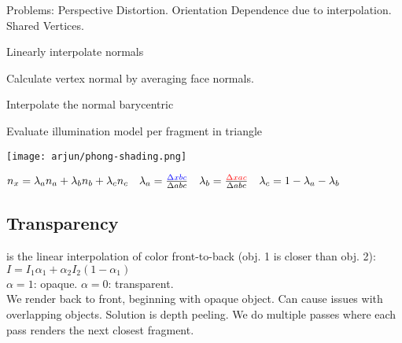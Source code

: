 Problems: Perspective Distortion. Orientation Dependence due to interpolation. Shared Vertices.

 Linearly interpolate normals
\begin{compactenum}
    \item Calculate vertex normal by averaging face normals.
    \item Interpolate the normal barycentric
    \item Evaluate illumination model per fragment in triangle
\end{compactenum}
\begin{center}
    \texttt{[image: arjun/phong-shading.png]}
\end{center}

$ n_x = \lambda_an_a + \lambda_bn_b + \lambda_cn_c  \quad \lambda_a = \frac{\color{blue} \Delta xbc}{\Delta abc} \quad \lambda_b = \frac{\color{red} \Delta xac}{\Delta abc} \quad \lambda_c = 1 - \lambda_a - \lambda_b$ 

\subsection*{Transparency}
 is the linear interpolation of color front-to-back (obj. 1 is closer than obj. 2): $I = I_1 \alpha_1 + \alpha_2 I_2 (1 - \alpha_1)$\\
$\alpha = 1 $: opaque. $\alpha = 0$: transparent.\\
We render back to front, beginning with opaque object. Can cause issues with overlapping objects. Solution is depth peeling. We do multiple passes where each pass renders the next closest fragment.